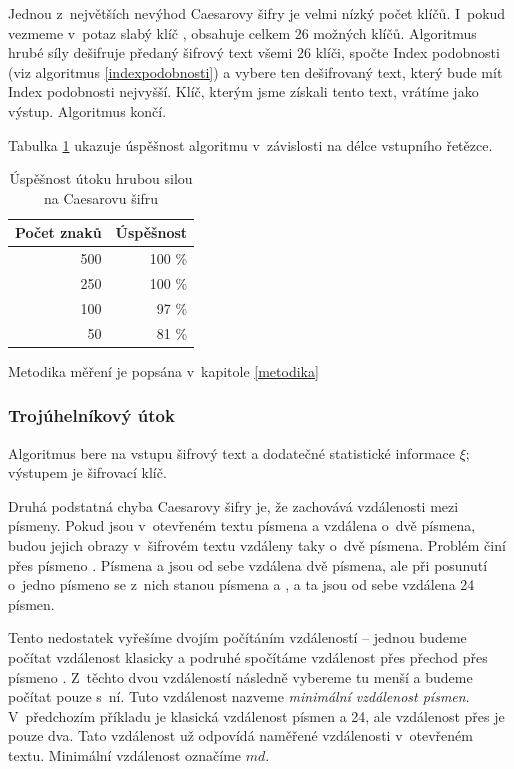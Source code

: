 \documentclass[12pt]{article}
\theoremstyle{definition}
\newcommand{\stats}{\xi}
\begin{document}
Jednou z~největších nevýhod Caesarovy šifry je velmi nízký počet klíčů. I~pokud vezmeme v~potaz slabý klíč , obsahuje celkem 26 možných klíčů. Algoritmus hrubé síly dešifruje předaný šifrový text všemi 26 klíči, spočte Index podobnosti (viz algoritmus \ref{indexpodobnosti}) a vybere ten dešifrovaný text, který bude mít Index podobnosti nejvyšší. Klíč, kterým jsme získali tento text, vrátíme jako výstup. Algoritmus končí. 

Tabulka \ref{tabcaesar} ukazuje úspěšnost algoritmu v~závislosti na délce vstupního řetězce.

\begin{table}[ht]
  \begin{center}
    \begin{tabular}{|r|r|}
    \hline
    Počet znaků&Úspěšnost\\
    \hline
    500&100 \%\\
    250&100 \%\\
    100&97 \%\\
    50&81 \%\\
    \hline
    \end{tabular}
    \caption{Úspěšnost útoku hrubou silou na Caesarovu šifru} 
    \label{tabcaesar}
  \end{center}
\end{table}

Metodika měření je popsána v~kapitole \ref{metodika}

\subsubsection{Trojúhelníkový útok}
\label{triangle}
Algoritmus bere na vstupu šifrový text a dodatečné statistické informace $\stats$; výstupem je šifrovací klíč. 

Druhá podstatná chyba Caesarovy šifry je, že zachovává vzdálenosti mezi písmeny. Pokud jsou v~otevřeném textu písmena  a  vzdálena o~dvě písmena, budou jejich obrazy v~šifrovém textu vzdáleny taky o~dvě písmena. Problém činí  přes písmeno . Písmena  a  jsou od sebe vzdálena dvě písmena, ale při posunutí o~jedno písmeno se z~nich stanou písmena  a , a ta jsou od sebe vzdálena 24 písmen. 

Tento nedostatek vyřešíme dvojím počítáním vzdáleností -- jednou budeme počítat vzdálenost klasicky a podruhé spočítáme vzdálenost přes přechod přes písmeno . Z~těchto dvou vzdáleností následně vybereme tu menší a budeme počítat pouze s~ní. Tuto vzdálenost nazveme {\em minimální vzdálenost písmen}. V~předchozím příkladu je klasická vzdálenost písmen  a  24, ale vzdálenost přes  je pouze dva. Tato vzdálenost už odpovídá naměřené vzdálenosti v~otevřeném textu. Minimální vzdálenost označíme $md$. 
\end{document}
